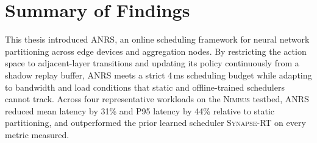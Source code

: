 \section{Summary of Findings}

This thesis introduced ANRS, an online scheduling framework for neural network partitioning across edge devices and aggregation nodes. By restricting the action space to adjacent-layer transitions and updating its policy continuously from a shadow replay buffer, ANRS meets a strict 4\,ms scheduling budget while adapting to bandwidth and load conditions that static and offline-trained schedulers cannot track. Across four representative workloads on the \textsc{Nimbus} testbed, ANRS reduced mean latency by 31\% and P95 latency by 44\% relative to static partitioning, and outperformed the prior learned scheduler \textsc{Synapse-RT} on every metric measured.
